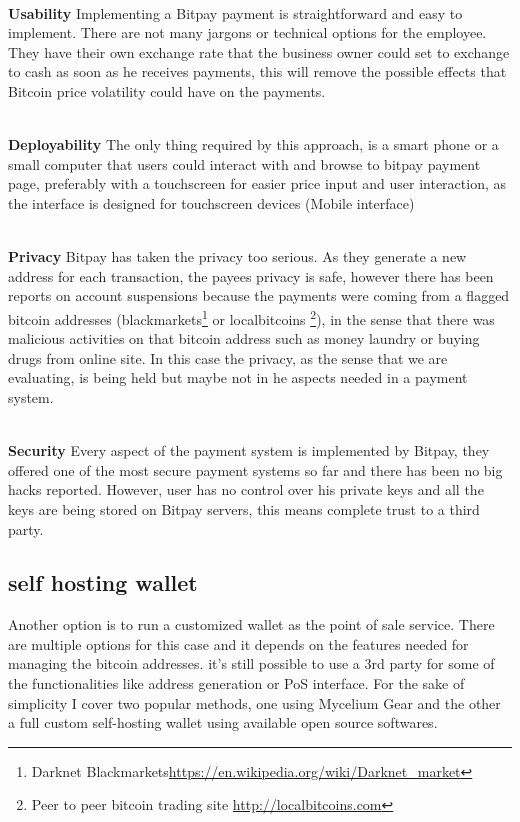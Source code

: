 \\ \textbf{Usability}
Implementing a Bitpay payment is straightforward and easy to implement. There are not many jargons or technical options for the employee. They have their own exchange rate that the business owner could set to exchange to cash as soon as he receives payments, this will remove the possible effects that Bitcoin price volatility could have on the payments.

\\ \textbf{Deployability}
The only thing required by this approach, is a smart phone or a small computer that users could interact with and browse to bitpay payment page, preferably with a touchscreen for easier price input and user interaction, as the interface is designed for touchscreen devices (Mobile interface)

\\ \textbf{Privacy}
Bitpay has taken the privacy too serious. As they generate a new address for each transaction, the payees privacy is safe, however there has been reports on account suspensions because the payments were coming from a flagged bitcoin addresses (\eg blackmarkets\footnote{Darknet Blackmarkets\url{https://en.wikipedia.org/wiki/Darknet_market}} or localbitcoins \footnote{Peer to peer bitcoin trading site \url{http://localbitcoins.com}}), in the sense that there was malicious activities on that bitcoin address such as money laundry or buying drugs from online site. In this case the privacy, as the sense that we are evaluating, is being held but maybe not in he aspects needed in a payment system.

\\ \textbf{Security}
Every aspect of the payment system is implemented by Bitpay, they offered one of the most secure payment systems so far and there has been no big hacks reported. However, user has no control over his private keys and all the keys are being stored on Bitpay servers, this means complete trust to a third party.


\subsection{self hosting wallet}
Another option is to run a customized wallet as the point of sale service. There are multiple options for this case and it depends on the features needed for managing the bitcoin addresses. it's still possible to use a 3rd party for some of the functionalities like address generation or PoS interface. For the sake of simplicity I cover two popular methods, one using Mycelium Gear and the other a full custom self-hosting wallet using available open source softwares.



